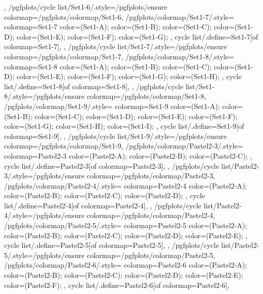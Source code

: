 {{  },
  /pgfplots/cycle list/Set1-6/.style={/pgfplots/ensure colormap={/pgfplots/colormap/Set1-6}},
  /pgfplots/colormap/Set1-7/.style={
    colormap={Set1-7}{
      color=(Set1-A);
      color=(Set1-B);
      color=(Set1-C);
      color=(Set1-D);
      color=(Set1-E);
      color=(Set1-F);
      color=(Set1-G);
    },
    cycle list/.define={Set1-7}{[of colormap=Set1-7]},
  },
  /pgfplots/cycle list/Set1-7/.style={/pgfplots/ensure colormap={/pgfplots/colormap/Set1-7}},
  /pgfplots/colormap/Set1-8/.style={
    colormap={Set1-8}{
      color=(Set1-A);
      color=(Set1-B);
      color=(Set1-C);
      color=(Set1-D);
      color=(Set1-E);
      color=(Set1-F);
      color=(Set1-G);
      color=(Set1-H);
    },
    cycle list/.define={Set1-8}{[of colormap=Set1-8]},
  },
  /pgfplots/cycle list/Set1-8/.style={/pgfplots/ensure colormap={/pgfplots/colormap/Set1-8}},
  /pgfplots/colormap/Set1-9/.style={
    colormap={Set1-9}{
      color=(Set1-A);
      color=(Set1-B);
      color=(Set1-C);
      color=(Set1-D);
      color=(Set1-E);
      color=(Set1-F);
      color=(Set1-G);
      color=(Set1-H);
      color=(Set1-I);
    },
    cycle list/.define={Set1-9}{[of colormap=Set1-9]},
  },
  /pgfplots/cycle list/Set1-9/.style={/pgfplots/ensure colormap={/pgfplots/colormap/Set1-9}},
  /pgfplots/colormap/Pastel2-3/.style={
    colormap={Pastel2-3}{
      color=(Pastel2-A);
      color=(Pastel2-B);
      color=(Pastel2-C);
    },
    cycle list/.define={Pastel2-3}{[of colormap=Pastel2-3]},
  },
  /pgfplots/cycle list/Pastel2-3/.style={/pgfplots/ensure colormap={/pgfplots/colormap/Pastel2-3}},
  /pgfplots/colormap/Pastel2-4/.style={
    colormap={Pastel2-4}{
      color=(Pastel2-A);
      color=(Pastel2-B);
      color=(Pastel2-C);
      color=(Pastel2-D);
    },
    cycle list/.define={Pastel2-4}{[of colormap=Pastel2-4]},
  },
  /pgfplots/cycle list/Pastel2-4/.style={/pgfplots/ensure colormap={/pgfplots/colormap/Pastel2-4}},
  /pgfplots/colormap/Pastel2-5/.style={
    colormap={Pastel2-5}{
      color=(Pastel2-A);
      color=(Pastel2-B);
      color=(Pastel2-C);
      color=(Pastel2-D);
      color=(Pastel2-E);
    },
    cycle list/.define={Pastel2-5}{[of colormap=Pastel2-5]},
  },
  /pgfplots/cycle list/Pastel2-5/.style={/pgfplots/ensure colormap={/pgfplots/colormap/Pastel2-5}},
  /pgfplots/colormap/Pastel2-6/.style={
    colormap={Pastel2-6}{
      color=(Pastel2-A);
      color=(Pastel2-B);
      color=(Pastel2-C);
      color=(Pastel2-D);
      color=(Pastel2-E);
      color=(Pastel2-F);
    },
    cycle list/.define={Pastel2-6}{[of colormap=Pastel2-6]},
}}

